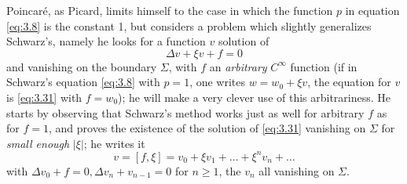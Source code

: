\documentclass[12pt,a4paper,leqno,twoside]{extbook}
\begin{document}
Poincaré, as Picard, limits himself to the case in which the function \(p\) in equation \eqref{eq:3.8} is the constant 1, but considers a problem which slightly generalizes Schwarz's, namely he looks for a function \(v\) solution of
\begin{equation}
    \label{eq:3.31}
    \Delta v + \xi v + f = 0
\end{equation}
and vanishing on the boundary \(\Sigma\), with \(f\) an \emph{arbitrary} \(C^\infty\) function (if in Schwarz's equation \eqref{eq:3.8} with \(p = 1\), one writes \(w = w_0 + \xi v\), the equation for \(v\) is \eqref{eq:3.31} with \(f=w_0\)); he will make a very clever use of this arbitrariness. He starts by observing that Schwarz's method works just as well for arbitrary \(f\) as for \(f = 1\), and proves the existence of the solution of \eqref{eq:3.31} vanishing on \(\Sigma\) for \emph{small enough} \(|\xi|\); he writes it
\[
    v = [f, \xi] = v_0 + \xi v_1 + \ldots + \xi^n v_n + \ldots
\]
with \(\Delta v_0 + f = 0, \Delta v_n + v_{n-1}=0\) for \(n \geq 1\), the \(v_n\) all vanishing on \(\Sigma\).
\end{document}
